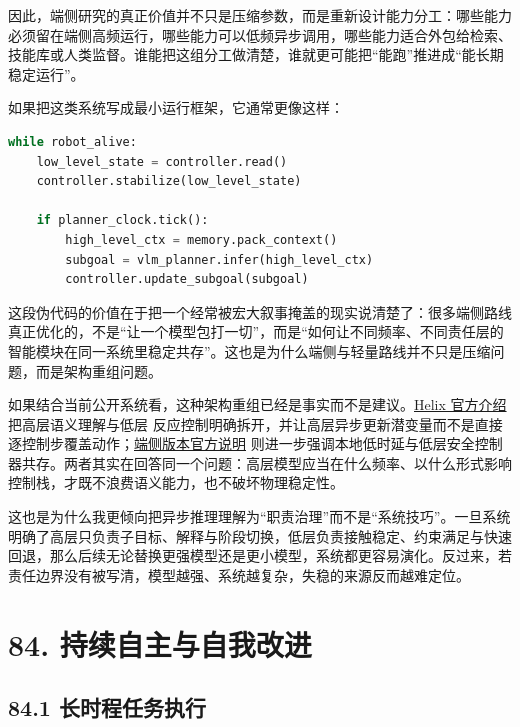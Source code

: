 因此，端侧研究的真正价值并不只是压缩参数，而是重新设计能力分工：哪些能力必须留在端侧高频运行，哪些能力可以低频异步调用，哪些能力适合外包给检索、技能库或人类监督。谁能把这组分工做清楚，谁就更可能把“能跑”推进成“能长期稳定运行”。

如果把这类系统写成最小运行框架，它通常更像这样：

\begin{lstlisting}[language=python]
while robot_alive:
    low_level_state = controller.read()
    controller.stabilize(low_level_state)

    if planner_clock.tick():
        high_level_ctx = memory.pack_context()
        subgoal = vlm_planner.infer(high_level_ctx)
        controller.update_subgoal(subgoal)
\end{lstlisting}

这段伪代码的价值在于把一个经常被宏大叙事掩盖的现实说清楚了：很多端侧路线真正优化的，不是“让一个模型包打一切”，而是“如何让不同频率、不同责任层的智能模块在同一系统里稳定共存”。这也是为什么端侧与轻量路线并不只是压缩问题，而是架构重组问题。

如果结合当前公开系统看，这种架构重组已经是事实而不是建议。\href{https://www.figure.ai/news/helix}{Helix 官方介绍} 把高层语义理解与低层 \texttt{} 反应控制明确拆开，并让高层异步更新潜变量而不是直接逐控制步覆盖动作；\href{https://deepmind.google/blog/gemini-robotics-on-device-brings-ai-to-local-robotic-devices/}{端侧版本官方说明} 则进一步强调本地低时延与低层安全控制器共存。两者其实在回答同一个问题：高层模型应当在什么频率、以什么形式影响控制栈，才既不浪费语义能力，也不破坏物理稳定性。

这也是为什么我更倾向把异步推理理解为“职责治理”而不是“系统技巧”。一旦系统明确了高层只负责子目标、解释与阶段切换，低层负责接触稳定、约束满足与快速回退，那么后续无论替换更强模型还是更小模型，系统都更容易演化。反过来，若责任边界没有被写清，模型越强、系统越复杂，失稳的来源反而越难定位。

\chapter*{84. 持续自主与自我改进}

\section*{84.1 长时程任务执行}


